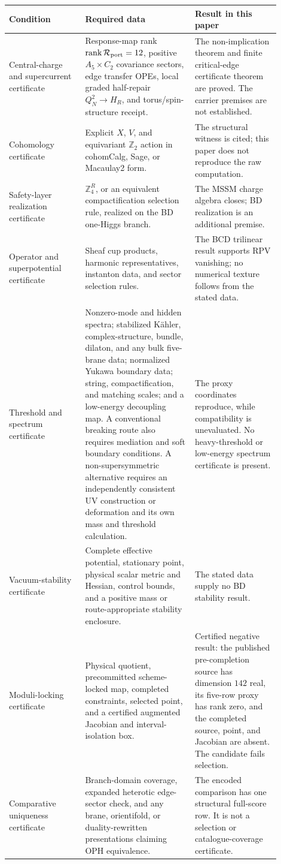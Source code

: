 \documentclass[11pt]{article}
\theoremstyle{remark}
\theoremstyle{plain}
\newcommand{\Z}{\mathbb Z}
\newcommand{\calR}{\mathcal R}
\newcommand{\ZfourR}{\mathbb Z_4^R}
\begin{document}
\begin{longtable}{L{0.25\linewidth}L{0.36\linewidth}L{0.29\linewidth}}
\toprule
\textbf{Condition} & \textbf{Required data} & \textbf{Result in this paper} \\
\midrule
Central-charge and supercurrent certificate & Response-map rank
\(\operatorname{rank}\calR_{\rm port}=12\), positive \(A_5\times C_2\) covariance sectors, edge
transfer OPEs, local graded half-repair \(Q_N^2\to H_R\), and torus/spin-structure receipt. &
The non-implication theorem and finite critical-edge certificate theorem are proved. The carrier
premises are not established. \\
Cohomology certificate & Explicit \(X\), \(V\), and equivariant \(\Z_2\) action in
cohomCalg, Sage, or Macaulay2 form. & The structural witness is cited; this paper does not
reproduce the raw computation. \\
Safety-layer realization certificate & \(\ZfourR\), or an equivalent compactification selection rule,
realized on the BD one-Higgs branch. & The MSSM charge algebra closes; BD realization is an
additional premise. \\
Operator and superpotential certificate & Sheaf cup products, harmonic representatives, instanton
data, and sector selection rules. & The BCD trilinear result supports RPV vanishing; no numerical
texture follows from the stated data. \\
Threshold and spectrum certificate & Nonzero-mode and hidden spectra; stabilized K\"ahler,
complex-structure, bundle, dilaton, and any bulk five-brane data; normalized Yukawa boundary
data; string, compactification, and matching scales; and a low-energy decoupling map. A conventional breaking route also requires mediation and soft
boundary conditions. A non-supersymmetric alternative requires an independently consistent UV
construction or deformation and its own mass and threshold calculation. & The proxy coordinates
reproduce, while compatibility is unevaluated. No heavy-threshold or
low-energy spectrum certificate is present. \\
Vacuum-stability certificate & Complete effective potential, stationary point, physical scalar
metric and Hessian, control bounds, and a positive mass or route-appropriate stability enclosure. &
The stated data supply no BD stability result. \\
Moduli-locking certificate & Physical quotient, precommitted scheme-locked map, completed
constraints, selected point, and a certified augmented Jacobian and interval-isolation box. &
Certified negative result: the published pre-completion source has dimension \(142\)
real, its five-row proxy has rank zero, and the completed source, point, and Jacobian are absent.
The candidate fails selection. \\
Comparative uniqueness certificate & Branch-domain coverage, expanded heterotic edge-sector
check, and any brane, orientifold, or duality-rewritten presentations claiming OPH equivalence. &
The encoded comparison has one structural full-score row. It is not a selection or catalogue-coverage
certificate. \\
\bottomrule
\end{longtable}
\end{document}
